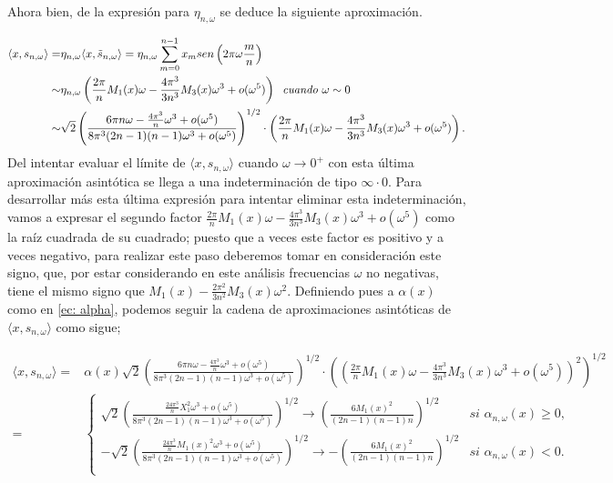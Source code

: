 \noindent
Ahora bien, de la expresión para
$\eta_{n, \omega}$ se deduce la siguiente aproximación.

\begin{align*}
\langle x,
s_{n, \omega}
\rangle =
& 
\eta_{n, \omega} \langle x,
\tilde{s}_{n, \omega}
\rangle =  
\eta_{n, \omega} \sum\limits_{m=0}^{n-1}x_{m} sen \left(
2 \pi \omega \frac{m}{n}
\right) \\
\sim &
\eta_{n, \omega}
\left(
\frac{2 \pi}{n} M_{1}(x) \omega - \frac{4 \pi^{3}}{3n^{3}}M_{3}(x) \omega^{3} 
 + o(\omega^{5})
\right)
\hspace{0.2cm}
\textit{cuando } \omega \sim 0
\\
\sim & 
\sqrt{2} 
\left(
\frac{
6 \pi n \omega -
\frac{4 \pi^{3}}{n} \omega^{3} + o(\omega^{5})
}{8 \pi^{3} (2n-1)(n-1)\omega^{3} + o(\omega^{5})
}
\right)^{1/2}
\cdot 
\left(
\frac{2 \pi}{n} M_{1}(x) \omega - \frac{4 \pi^{3}}{3n^{3}}M_{3}(x) \omega^{3} 
 + o(\omega^{5})
\right).
\end{align*}
Del intentar evaluar el límite de
$\langle x,
s_{n, \omega}
\rangle $ cuando $\omega \rightarrow 0^{+}$
con esta última aproximación asintótica se llega a una
indeterminación de tipo $\infty \cdot 0$.
Para desarrollar más esta última expresión para intentar
eliminar esta indeterminación, vamos a expresar 
el segundo factor 
$
\frac{2 \pi}{n} M_{1}(x) \omega - \frac{4 \pi^{3}}{3n^{3}}M_{3}(x) \omega^{3} 
 + o(\omega^{5})
$
como la raíz cuadrada de su cuadrado; puesto que
a veces este factor es positivo y a veces negativo, para realizar
este paso deberemos tomar en consideración
este signo, que, por estar considerando en este análisis
frecuencias $\omega$ no negativas, tiene
el mismo signo que 
$M_{1}(x) - \frac{2\pi^{2}}{3n^{2}}M_{3}(x) \omega^{2}$.
Definiendo pues a $\alpha(x)$
como en  
\ref{ec: alpha},
podemos seguir la cadena
de aproximaciones asintóticas de 
$\langle x,
s_{n, \omega}
\rangle $ como sigue;

\begin{align*}
\langle x,
s_{n, \omega}
\rangle = &
\alpha(x)
\sqrt{2} 
\left(
\frac{
6 \pi n \omega -
\frac{4 \pi^{3}}{n} \omega^{3} + o(\omega^{5})
}{8 \pi^{3} (2n-1)(n-1)\omega^{3} + o(\omega^{5})
}
\right)^{1/2}
\cdot 
\left(
\left(
\frac{2 \pi}{n} M_{1}(x) \omega - \frac{4 \pi^{3}}{3n^{3}}M_{3}(x) \omega^{3} 
 + o(\omega^{5})
\right)^{2}
\right)^{1/2}\\
= &
\begin{cases}
\sqrt{2} \left(
\frac{
\frac{24 \pi^{3}}{n}X_{1}^{2}\omega^{3} + o(\omega^{5}) }{
8 \pi^{3} (2n-1)(n-1)\omega^{3} + o(\omega^{5})
}
\right)^{1/2}
\rightarrow \left(
\frac{6 M_{1}(x)^{2}}{(2n-1)(n-1)n}
\right)^{1/2} & \textit{si } \alpha_{n, \omega}(x) \geq 0, \\
-\sqrt{2} \left(
\frac{
\frac{24 \pi^{3}}{n}M_{1}(x)^{2}\omega^{3} + o(\omega^{5}) }{
8 \pi^{3} (2n-1)(n-1)\omega^{3} + o(\omega^{5})
}
\right)^{1/2}
\rightarrow -\left(
\frac{6 M_{1}(x)^{2}}{(2n-1)(n-1)n}
\right)^{1/2} & \textit{si } \alpha_{n, \omega}(x) < 0.\\
\end{cases}
\end{align*}

